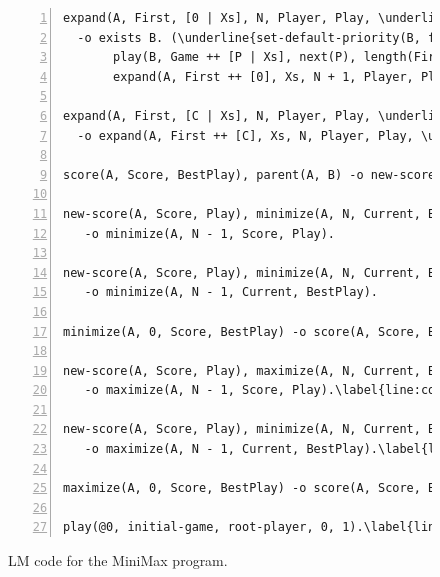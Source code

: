 \begin{figure}[ht]
\begin{Verbatim}[numbers=left,commandchars=\\\{\},fontsize=\tiny]
expand(A, First, [0 | Xs], N, Player, Play, \underline{Depth}), Depth < 5\label{line:coord:minimax_rule41}\hfill// Rule 6: create child node.
  -o exists B. (\underline{set-default-priority(B, float(Depth + 1))},\label{line:coord:minimax_coord3}
       play(B, Game ++ [P | Xs], next(P), length(First), \underline{Depth + 1}), parent(B, A),
       expand(A, First ++ [0], Xs, N + 1, Player, Play, \underline{Depth})).\label{line:coord:minimax_rule42}

expand(A, First, [C | Xs], N, Player, Play, \underline{Depth}) C <> 0\label{line:coord:minimax_expand11}\label{line:coord:minimax_rule51}\hfill// Rule 7: next game play.
  -o expand(A, First ++ [C], Xs, N, Player, Play, \underline{Depth}).\label{line:coord:minimax_expand2}\label{line:coord:minimax_rule52}

score(A, Score, BestPlay), parent(A, B) -o new-score(B, Score, BestPlay).\label{line:coord:minimax_new}\hfill// Rule 8: sending score to parent node.

new-score(A, Score, Play), minimize(A, N, Current, BestPlay), Current > Score\label{line:coord:minimax_minimize1}\hfill// Rule 9: keep current score.
   -o minimize(A, N - 1, Score, Play).

new-score(A, Score, Play), minimize(A, N, Current, BestPlay), Current <= Score\hfill// Rule 10: select new best.
   -o minimize(A, N - 1, Current, BestPlay).

minimize(A, 0, Score, BestPlay) -o score(A, Score, BestPlay).\label{line:coord:minimax_minimize2}// Rule 11: score minimized.

new-score(A, Score, Play), maximize(A, N, Current, BestPlay), Current < Score\label{line:coord:minimax_maximize1}\label{line:coord:minimax_maximize_rule11}\hfill// Rule 12: keep current score.
   -o maximize(A, N - 1, Score, Play).\label{line:coord:minimax_maximize_rule12}

new-score(A, Score, Play), minimize(A, N, Current, BestPlay), Current >= Score\label{line:coord:minimax_maximize_rule21}\hfill// Rule 13: select new best.
   -o maximize(A, N - 1, Current, BestPlay).\label{line:coord:minimax_maximize_rule22}

maximize(A, 0, Score, BestPlay) -o score(A, Score, BestPlay).\label{line:coord:minimax_maximize2}\hfill// Rule 14: score maximized.

play(@0, initial-game, root-player, 0, 1).\label{line:coord:minimax_axiom}\hfill// Initial fact.
\end{Verbatim}
\caption{LM code for the MiniMax program.}
\label{code:coord:minimax}
\end{figure}

